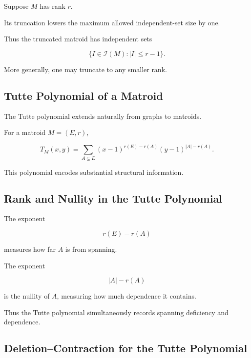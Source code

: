 Suppose \(M\) has rank \(r\).

Its truncation lowers the maximum allowed independent-set size by one.

Thus the truncated matroid has independent sets

\[
\boxed{
\{
I\in\mathcal{I}(M):
|I|\leq r-1
\}.
}
\]

More generally, one may truncate to any smaller rank.

\subsection{Tutte Polynomial of a Matroid}
\label{subsec:matroid-tutte-polynomial}

The Tutte polynomial extends naturally from graphs to matroids.

For a matroid \(M=(E,r)\),

\[
\boxed{
T_M(x,y)
=
\sum_{A\subseteq E}
(x-1)^{r(E)-r(A)}
(y-1)^{|A|-r(A)}.
}
\]

This polynomial encodes substantial structural information.

\subsection{Rank and Nullity in the Tutte Polynomial}
\label{subsec:rank-nullity-tutte}

The exponent

\[
r(E)-r(A)
\]

measures how far \(A\) is from spanning.

The exponent

\[
|A|-r(A)
\]

is the nullity of \(A\), measuring how much dependence it contains.

Thus the Tutte polynomial simultaneously records spanning deficiency
and dependence.

\subsection{Deletion--Contraction for the Tutte Polynomial}
\label{subsec:tutte-deletion-contraction-matroid}

